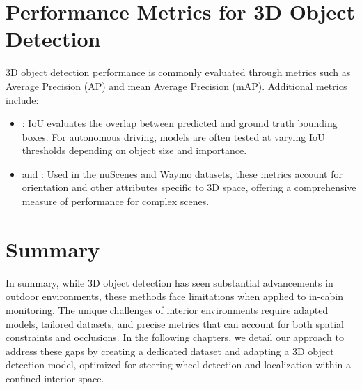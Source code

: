 \section{Performance Metrics for 3D Object Detection}
3D object detection performance is commonly evaluated through metrics 
such as Average Precision (AP) and mean Average Precision (mAP).
Additional metrics include:
\begin{itemize}
    \item {}: 
    IoU evaluates the overlap between predicted and ground truth bounding 
    boxes. For autonomous driving, models are often tested at varying IoU 
    thresholds depending on object size and importance.
    \item {} and : 
    Used in the nuScenes and Waymo datasets, these metrics account for 
    orientation and other attributes specific to 3D space, offering a 
    comprehensive measure of performance for complex scenes.    
\end{itemize}


\section{Summary}
In summary, while 3D object detection has seen substantial advancements 
in outdoor environments, these methods face limitations when applied to 
in-cabin monitoring. The unique challenges of interior environments 
require adapted models, tailored datasets, and precise metrics that can 
account for both spatial constraints and occlusions. In the following 
chapters, we detail our approach to address these gaps by creating a 
dedicated dataset and adapting a 3D object detection model, optimized 
for steering wheel detection and localization within a confined interior 
space.
